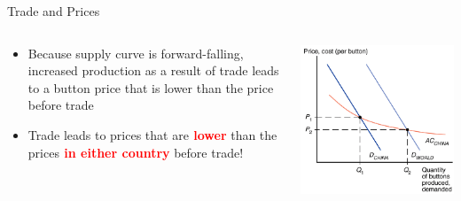 \documentclass[10pt,hyperref={CJKbookmarks=true},xcolor=dvipsnames,aspectratio=169]{beamer}
\begin{document}
\begin{frame}{Trade and Prices}


\begin{columns}[onlytextwidth]
\begin{column}{0.5\textwidth}
\begin{itemize}
\item Because supply curve is forward-falling, increased production as a
result of trade leads to a button price that is lower than the price
before trade 
\item Trade leads to prices that are\textbf{\textcolor{red}{{} lower}} than
the prices\textbf{\textcolor{red}{{} in either country}} before trade!
\end{itemize}

\end{column}
\begin{column}{0.5\textwidth}
\includegraphics[width=\columnwidth]{fig/krugman/lec6-8}
\end{column}
\end{columns}

\end{frame}
\end{document}
